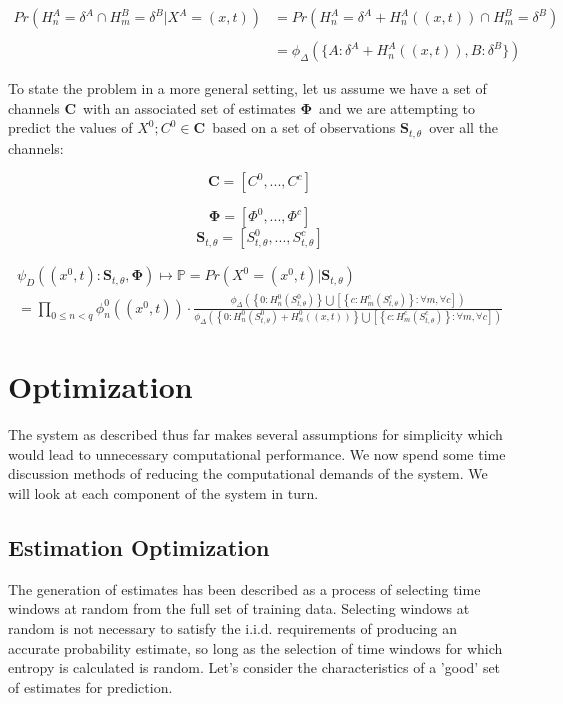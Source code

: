 \documentclass[10pt]{article}
\begin{document}
\begin{align}
Pr \left( H_n^A = \delta^A \cap H_m^B = \delta^B | X^A = (x,t) \right) &= Pr \left( H_n^A = \delta^A + H_n^A((x,t)) \cap H_m^B = \delta^B \right) \nonumber \\
\nonumber \\
&= \phi_\Delta \left( \{ A:\delta^A + H_n^A((x,t)), B: \delta^B \} \right)
\end{align}

To state the problem in a more general setting, let us assume we have a set of channels \(\mathbf{C} \,\!\) with an associated set of estimates \(\mathbf{\Phi} \,\!\) and we are attempting to predict the values of \(X^0; C^0 \in \mathbf{C} \,\!\) based on a set of observations \(\mathbf{S}_{t,\theta} \,\!\) over all the channels:


\[ \mathbf{C} = [C^0,...,C^c] \nonumber \]

\[ \mathbf{\Phi} = [\Phi^0,...,\Phi^c] \nonumber \]
\[ \mathbf{S}_{t,\theta} = [ S_{t,\theta}^0,...,S_{t,\theta}^c] \nonumber \]

\begin{multline} \psi_D \left( (x^0,t):\mathbf{S}_{t,\theta},\mathbf{\Phi} \right) \mapsto \mathbb{P} = Pr \left( X^0 = (x^0,t) | \mathbf{S}_{t,\theta} \right) \\
= \prod_{0 \le n < q} \phi_n^0 \left( (x^0,t) \right) \cdot \frac
{ \phi_\Delta \left( \left \{ 0: H_n^0(S_{t,\theta}^0) \right \} \bigcup \left[ \left \{ c: H_m^c(S_{t,\theta}^c) \right \} : \forall m, \forall c \right] \right) }
{ \phi_\Delta \left( \left \{ 0: H_n^0(S_{t,\theta}^0) + H_n^0 \left( (x,t) \right) \right \} \bigcup \left[ \left \{ c: H_m^c(S_{t,\theta}^c) \right \} : \forall m, \forall c \right] \right) }
\end{multline}


\section{Optimization}
The system as described thus far makes several assumptions for simplicity which would lead to unnecessary computational performance.  We now spend some time discussion methods of reducing the computational demands of the system.  We will look at each component of the system in turn.

\subsection{Estimation Optimization}
The generation of estimates has been described as a process of selecting time windows at random from the full set of training data.  Selecting windows at random is not necessary to satisfy the i.i.d. requirements of producing an accurate probability estimate, so long as the selection of time windows for which entropy is calculated is random.  Let's consider the characteristics of a 'good' set of estimates for prediction.  
\end{document}
